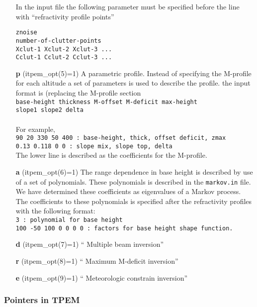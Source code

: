 \documentclass{saclantc}
\begin{document}
\begin{itemize}
In the input file the following parameter must be specified before 
the line with  ``refractivity profile points'' 

{\tt              znoise}\\
{\tt number-of-clutter-points     }\\
{\tt Xclut-1  Xclut-2  Xclut-3 ...}\\
{\tt Cclut-1  Cclut-2 Cclut-3  ... }\\

 \item[\bf p]  (itpem\_opt(5)=1) A parametric profile. Instead of specifying the M-profile
 for each altitude a set of parameters is used to describe the
 profile. the input format is (replacing the M-profile section\\
{\tt base-height thickness M-offset M-deficit max-height  }\\
{\tt slope1 slope2 delta}\\
\\
For example,\\
{\tt 90 20 330 50 400 : base-height, thick, offset deficit, zmax}\\
{\tt 0.13 0.118 0 0  : slope mix, slope top, delta}\\

The lower line is described as the coefficients for the M-profile.

\item[\bf a] (itpem\_opt(6)=1)
The range dependence in base height is described by use of a set of
polynomials. These polynomials is described in the  {\tt markov.in}
file. We have determined these coefficients as eigenvalues of a Markov
process.
The coefficients to these polynomials is specified after the
refractivity profiles with the following format:\\
{\tt 3                   : polynomial for base height}\\
{\tt 100 -50 100  0 0 0 0   : factors for base height shape function.}\\

\item[\bf d] (itpem\_opt(7)=1) `` Multiple beam inversion''
\item[\bf r] (itpem\_opt(8)=1) `` Maximum M-deficit inversion''
\item[\bf e] (itpem\_opt(9)=1) `` Meteorologic constrain inversion''

\end{itemize}

\subsubsection{Pointers in TPEM}
\label{se:tpempoint}
\end{document}
